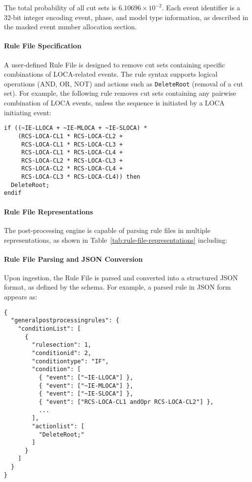 The total probability of all cut sets is $6.10696 \times 10^{-2}$. Each event identifier is a 32-bit integer encoding event, phase, and model type information, as described in the masked event number allocation section.

\paragraph{Rule File Specification}

A user-defined Rule File is designed to remove cut sets containing specific combinations of LOCA-related events. The rule syntax supports logical operations (AND, OR, NOT) and actions such as \texttt{DeleteRoot} (removal of a cut set). For example, the following rule removes cut sets containing any pairwise combination of LOCA events, unless the sequence is initiated by a LOCA initiating event:

\begin{verbatim}
if ((~IE-LLOCA + ~IE-MLOCA + ~IE-SLOCA) *
    (RCS-LOCA-CL1 * RCS-LOCA-CL2 +
     RCS-LOCA-CL1 * RCS-LOCA-CL3 +
     RCS-LOCA-CL1 * RCS-LOCA-CL4 +
     RCS-LOCA-CL2 * RCS-LOCA-CL3 +
     RCS-LOCA-CL2 * RCS-LOCA-CL4 +
     RCS-LOCA-CL3 * RCS-LOCA-CL4)) then
  DeleteRoot;
endif
\end{verbatim}

\paragraph{Rule File Representations}

The post-processing engine is capable of parsing rule files in multiple representations, as shown in Table~\ref{tab:rule-file-representations} including:



\paragraph{Rule File Parsing and JSON Conversion}

Upon ingestion, the Rule File is parsed and converted into a structured JSON format, as defined by the schema. For example, a parsed rule in JSON form appears as:

\begin{verbatim}
{
  "generalpostprocessingrules": {
    "conditionList": [
      {
        "rulesection": 1,
        "conditionid": 2,
        "conditiontype": "IF",
        "condition": [
          { "event": ["~IE-LLOCA"] },
          { "event": ["~IE-MLOCA"] },
          { "event": ["~IE-SLOCA"] },
          { "event": ["RCS-LOCA-CL1 andOpr RCS-LOCA-CL2"] },
          ...
        ],
        "actionlist": [
          "DeleteRoot;"
        ]
      }
    ]
  }
}
\end{verbatim}

